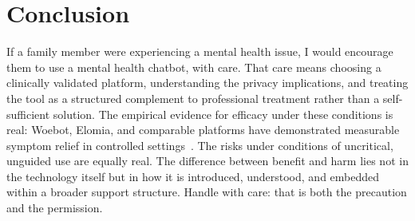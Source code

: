 \documentclass[11pt,showkeys]{essay}
\begin{document}
\section{Conclusion}

If a family member were experiencing a mental health issue, I would encourage them to use a mental health chatbot, with care. That care means choosing a clinically validated platform, understanding the privacy implications, and treating the tool as a structured complement to professional treatment rather than a self-sufficient solution. The empirical evidence for efficacy under these conditions is real: Woebot, Elomia, and comparable platforms have demonstrated measurable symptom relief in controlled settings~\cite{fitzpatrick_delivering_2017,romanovskyi_elomia_2021}. The risks under conditions of uncritical, unguided use are equally real. The difference between benefit and harm lies not in the technology itself but in how it is introduced, understood, and embedded within a broader support structure. Handle with care: that is both the precaution and the permission.


\end{document}
